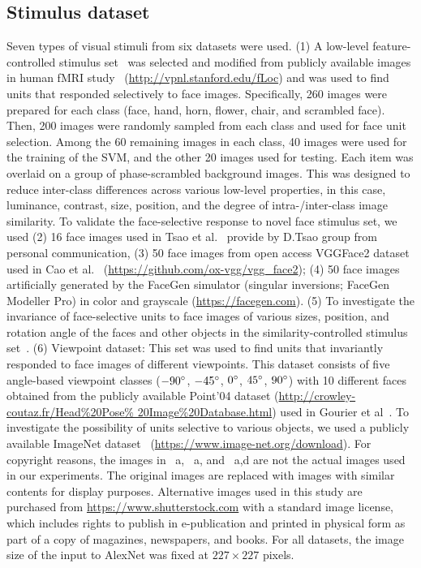 \documentclass[sn-mathphys]{sn-jnl}%
\theoremstyle{thmstyleone}%
\theoremstyle{thmstyletwo}%
\theoremstyle{thmstylethree}%
\begin{document}
\subsection{Stimulus dataset}
Seven types of visual stimuli from six datasets were used.
(1) A low-level feature-controlled stimulus set~\cite{stigliani2015temporal} was selected and modified from publicly available images in human fMRI study~\cite{stigliani2015temporal} (\url{http://vpnl.stanford.edu/fLoc}) 
and was used to find units that responded selectively to face images.
Specifically, 260 images were prepared for each class (face, hand, horn, flower, chair, and scrambled face).
Then, 200 images were randomly sampled from each class and used for face unit selection.
Among the 60 remaining images in each class, 40 images were used for the training of the SVM, 
and the other 20 images used for testing.
Each item was overlaid on a group of phase-scrambled background images.
This was designed to reduce inter-class differences across various low-level properties,
in this case, luminance, contrast, size, position, and the degree of intra-/inter-class image similarity.
To validate the face-selective response to novel face stimulus set, we used (2) 16 face images used in Tsao et al.~\cite{tsao2006cortical,freiwald2010functional} provide by D.Tsao group from personal communication,
(3) 50 face images from open access VGGFace2 dataset used in Cao et al.~\cite{cao2018vggface2} (\url{https://github.com/ox-vgg/vgg_face2});
(4) 50 face images artificially generated by the FaceGen simulator (singular inversions; FaceGen Modeller Pro) in color and grayscale (\url{https://facegen.com}).
(5) To investigate the invariance of face-selective units to face images of various sizes, position, and rotation angle of the faces and other objects in the similarity-controlled stimulus set~\cite{stigliani2015temporal}.
(6) Viewpoint dataset: This set was used to find units that invariantly responded to face images of different viewpoints.
This dataset consists of five angle-based viewpoint classes ($ -90\degree $, $ -45\degree $, $ 0\degree $, $ 45\degree $, $ 90\degree $) with 10 different faces obtained from the publicly available Point'04 dataset (\url{http://crowley-coutaz.fr/Head%20Pose%	20Image%20Database.html}) used in Gourier et al~\cite{gourier2004estimating}.
To investigate the possibility of units selective to various objects, we used a publicly available ImageNet dataset~\cite{ILSVRC15} (\url{https://www.image-net.org/download}).
For copyright reasons, the images in ~a, ~a, and ~a,d are not the actual images used in our experiments.
The original images are replaced with images with similar contents for display purposes.
Alternative images used in this study are purchased from \url{https://www.shutterstock.com} with a standard image license, which includes rights to publish in e-publication and printed in physical form as part of a copy of magazines, newspapers, and books.
For all datasets, the image size of the input to AlexNet was fixed at $ 227 \times 227 $ pixels.
\end{document}
